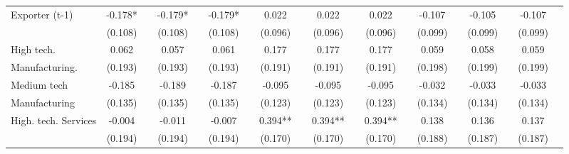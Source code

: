 \begin{table}[htbp]
\begin{tabular}{l*{18}{c}}
Exporter (t-1)      &      -0.178*  &               &      -0.179*  &               &      -0.179*  &               &       0.022   &               &       0.022   &               &       0.022   &               &      -0.107   &               &      -0.105   &               &      -0.107   &               \\
                    &     (0.108)   &               &     (0.108)   &               &     (0.108)   &               &     (0.096)   &               &     (0.096)   &               &     (0.096)   &               &     (0.099)   &               &     (0.099)   &               &     (0.099)   &               \\
High tech.          &       0.062   &               &       0.057   &               &       0.061   &               &       0.177   &               &       0.177   &               &       0.177   &               &       0.059   &               &       0.058   &               &       0.059   &               \\
Manufacturing.      &     (0.193)   &               &     (0.193)   &               &     (0.193)   &               &     (0.191)   &               &     (0.191)   &               &     (0.191)   &               &     (0.198)   &               &     (0.199)   &               &     (0.199)   &               \\
Medium tech         &      -0.185   &               &      -0.189   &               &      -0.187   &               &      -0.095   &               &      -0.095   &               &      -0.095   &               &      -0.032   &               &      -0.033   &               &      -0.033   &               \\
Manufacturing       &     (0.135)   &               &     (0.135)   &               &     (0.135)   &               &     (0.123)   &               &     (0.123)   &               &     (0.123)   &               &     (0.134)   &               &     (0.134)   &               &     (0.134)   &               \\
High. tech. Services&      -0.004   &               &      -0.011   &               &      -0.007   &               &       0.394** &               &       0.394** &               &       0.394** &               &       0.138   &               &       0.136   &               &       0.137   &               \\
                    &     (0.194)   &               &     (0.194)   &               &     (0.194)   &               &     (0.170)   &               &     (0.170)   &               &     (0.170)   &               &     (0.188)   &               &     (0.187)   &               &     (0.187)   &               \\

\end{tabular}
\end{table}
